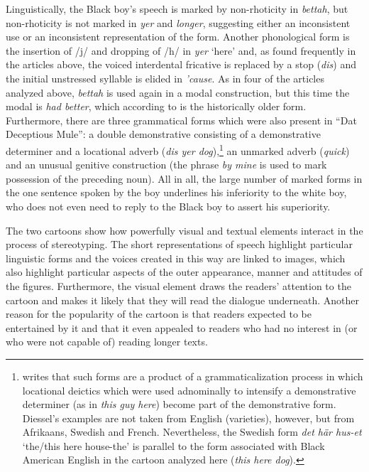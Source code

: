 Linguistically, the Black boy’s speech is marked by non-rhoticity in \emph{bettah}, but non-rhoticity is not marked in \emph{yer} and \emph{longer}, suggesting either an inconsistent use or an inconsistent representation of the form. Another phonological form is the insertion of /j/ and dropping of /h/ in \emph{yer} ‘here’ and, as found frequently in the articles above, the voiced interdental fricative is replaced by a stop (\emph{dis}) and the initial unstressed syllable is elided in \emph{’cause}. As in four of the articles analyzed above, \emph{bettah} is used again in a modal construction, but this time the modal is \emph{had better}, which according to \citet[131]{vanderAuwera2013} is the historically older form. Furthermore, there are three grammatical forms which were also present in “Dat Deceptious Mule”: a double demonstrative consisting of a demonstrative determiner and a locational adverb (\emph{dis yer dog}),\footnote{\citet[74]{Diessel1999} writes that such forms are a product of a grammaticalization process in which locational deictics which were used adnominally to intensify a demonstrative determiner (as in \emph{this guy here}) become part of the demonstrative form. Diessel’s examples are not taken from English (varieties), however, but from Afrikaans, Swedish and French. Nevertheless, the Swedish form \emph{det här hus-et} ‘the/this here house-the’ is parallel to the form associated with Black American English in the cartoon analyzed here (\emph{this here dog}).} an unmarked adverb (\emph{quick}) and an unusual genitive construction (the phrase \emph{by mine} is used to mark possession of the preceding noun). All in all, the large number of marked forms in the one sentence spoken by the boy underlines his inferiority to the white boy, who does not even need to reply to the Black boy to assert his superiority.



The two cartoons show how powerfully visual and textual elements interact in the process of stereotyping. The short representations of speech highlight particular linguistic forms and the voices created in this way are linked to images, which also highlight particular aspects of the outer appearance, manner and attitudes of the figures. Furthermore, the visual element draws the readers’ attention to the cartoon and makes it likely that they will read the dialogue underneath. Another reason for the popularity of the cartoon is that readers expected to be entertained by it and that it even appealed to readers who had no interest in (or who were not capable of) reading longer texts.


